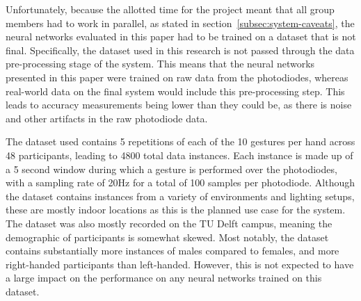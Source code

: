 Unfortunately, because the allotted time for the project meant that all group members had to work in parallel, as stated in section~\ref{subsec:system-caveats}, the neural networks evaluated in this paper had to be trained on a dataset that is not final.
Specifically, the dataset used in this research is not passed through the data pre-processing stage of the system.
This means that the neural networks presented in this paper were trained on raw data from the photodiodes, whereas real-world data on the final system would include this pre-processing step.
This leads to accuracy measurements being lower than they could be, as there is noise and other artifacts in the raw photodiode data.

The dataset used contains 5 repetitions of each of the 10 gestures per hand across 48 participants, leading to 4800 total data instances.
Each instance is made up of a 5 second window during which a gesture is performed over the photodiodes, with a sampling rate of 20Hz for a total of 100 samples per photodiode.
Although the dataset contains instances from a variety of environments and lighting setups, these are mostly indoor locations as this is the planned use case for the system.
The dataset was also mostly recorded on the TU Delft campus, meaning the demographic of participants is somewhat skewed.
Most notably, the dataset contains substantially more instances of males compared to females, and more right-handed participants than left-handed.
However, this is not expected to have a large impact on the performance on any neural networks trained on this dataset.